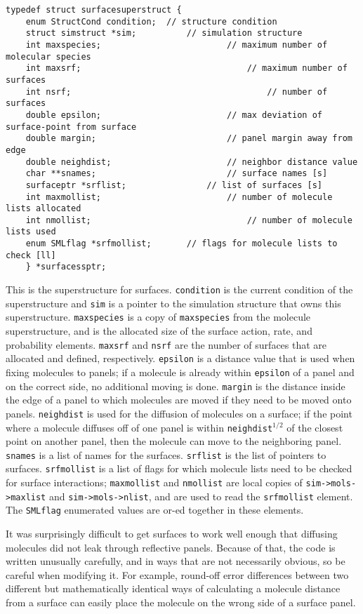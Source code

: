 \documentclass {book}
\begin{document}
\begin{lstlisting}
typedef struct surfacesuperstruct {
	enum StructCond condition;	// structure condition
	struct simstruct *sim;			// simulation structure
	int maxspecies;							// maximum number of molecular species
	int maxsrf;									// maximum number of surfaces
	int nsrf;										// number of surfaces
	double epsilon;							// max deviation of surface-point from surface
	double margin;							// panel margin away from edge
	double neighdist;						// neighbor distance value
	char **snames;							// surface names [s]
	surfaceptr *srflist;				// list of surfaces [s]
	int maxmollist;							// number of molecule lists allocated
	int nmollist;								// number of molecule lists used
	enum SMLflag *srfmollist;		// flags for molecule lists to check [ll]
	} *surfacessptr;
\end{lstlisting}

This is the superstructure for surfaces.  \texttt{condition} is the current condition of the superstructure and \texttt{sim} is a pointer to the simulation structure that owns this superstructure.  \texttt{maxspecies} is a copy of \texttt{maxspecies} from the molecule superstructure, and is the allocated size of the surface action, rate, and probability elements.  \texttt{maxsrf} and \texttt{nsrf} are the number of surfaces that are allocated and defined, respectively.  \texttt{epsilon} is a distance value that is used when fixing molecules to panels; if a molecule is already within \texttt{epsilon} of a panel and on the correct side, no additional moving is done.  \texttt{margin} is the distance inside the edge of a panel to which molecules are moved if they need to be moved onto panels.  \texttt{neighdist} is used for the diffusion of molecules on a surface; if the point where a molecule diffuses off of one panel is within \texttt{neighdist}$^{1/2}$ of the closest point on another panel, then the molecule can move to the neighboring panel.  \texttt{snames} is a list of names for the surfaces.  \texttt{srflist} is the list of pointers to surfaces.  \texttt{srfmollist} is a list of flags for which molecule lists need to be checked for surface interactions; \texttt{maxmollist} and \texttt{nmollist} are local copies of \texttt{sim->mols->maxlist} and \texttt{sim->mols->nlist}, and are used to read the \texttt{srfmollist} element.  The \texttt{SMLflag} enumerated values are or-ed together in these elements.

It was surprisingly difficult to get surfaces to work well enough that diffusing molecules did not leak through reflective panels.  Because of that, the code is written unusually carefully, and in ways that are not necessarily obvious, so be careful when modifying it.  For example, round-off error differences between two different but mathematically identical ways of calculating a molecule distance from a surface can easily place the molecule on the wrong side of a surface panel.
\end{document}
